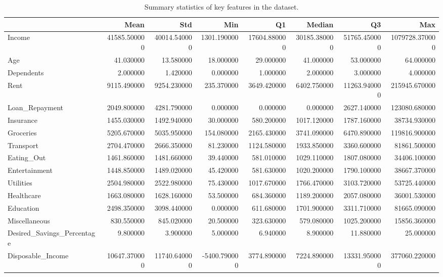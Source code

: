 \begin{table}
\caption{Summary statistics of key features in the dataset.}
\label{tab:feature-summary}
\begin{tabular}{lrrrrrrr}
\toprule
 & Mean & Std & Min & Q1 & Median & Q3 & Max \\
\midrule
Income & 41585.500000 & 40014.540000 & 1301.190000 & 17604.880000 & 30185.380000 & 51765.450000 & 1079728.370000 \\
Age & 41.030000 & 13.580000 & 18.000000 & 29.000000 & 41.000000 & 53.000000 & 64.000000 \\
Dependents & 2.000000 & 1.420000 & 0.000000 & 1.000000 & 2.000000 & 3.000000 & 4.000000 \\
Rent & 9115.490000 & 9254.230000 & 235.370000 & 3649.420000 & 6402.750000 & 11263.940000 & 215945.670000 \\
Loan\_Repayment & 2049.800000 & 4281.790000 & 0.000000 & 0.000000 & 0.000000 & 2627.140000 & 123080.680000 \\
Insurance & 1455.030000 & 1492.940000 & 30.000000 & 580.200000 & 1017.120000 & 1787.160000 & 38734.930000 \\
Groceries & 5205.670000 & 5035.950000 & 154.080000 & 2165.430000 & 3741.090000 & 6470.890000 & 119816.900000 \\
Transport & 2704.470000 & 2666.350000 & 81.230000 & 1124.580000 & 1933.850000 & 3360.600000 & 81861.500000 \\
Eating\_Out & 1461.860000 & 1481.660000 & 39.440000 & 581.010000 & 1029.110000 & 1807.080000 & 34406.100000 \\
Entertainment & 1448.850000 & 1489.020000 & 45.420000 & 581.630000 & 1020.200000 & 1790.100000 & 38667.370000 \\
Utilities & 2504.980000 & 2522.980000 & 75.430000 & 1017.670000 & 1766.470000 & 3103.720000 & 53725.440000 \\
Healthcare & 1663.080000 & 1628.160000 & 53.500000 & 684.360000 & 1189.200000 & 2057.080000 & 36001.530000 \\
Education & 2498.350000 & 3098.440000 & 0.000000 & 611.680000 & 1701.900000 & 3311.710000 & 81665.090000 \\
Miscellaneous & 830.550000 & 845.020000 & 20.500000 & 323.630000 & 579.080000 & 1025.200000 & 15856.360000 \\
Desired\_Savings\_Percentage & 9.800000 & 3.900000 & 5.000000 & 6.940000 & 8.900000 & 11.880000 & 25.000000 \\
Disposable\_Income & 10647.370000 & 11740.640000 & -5400.790000 & 3774.890000 & 7224.890000 & 13331.950000 & 377060.220000 \\
\bottomrule
\end{tabular}
\end{table}
